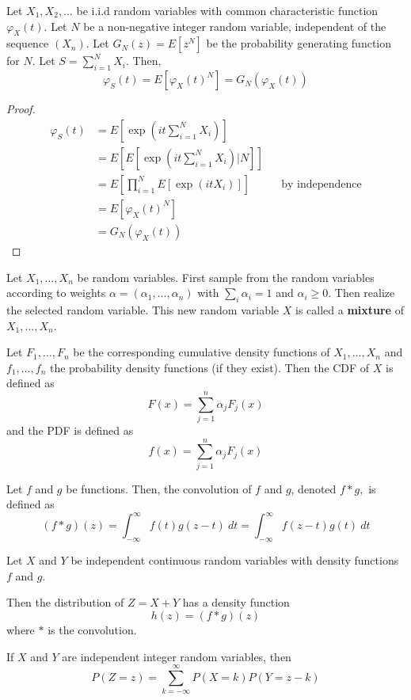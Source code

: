 \begin{theorem}\label{thm:char_func_random_sum}
Let $X_1, X_2, \ldots$ be i.i.d random variables with common characteristic function $\varphi_X(t)$.
Let $N$ be a non-negative integer random variable, independent of the sequence $(X_n)$.
Let $G_N(z) = E[z^N]$ be the probability generating function for $N$.
Let $S = \sum_{i = 1}^N X_i$.
Then,
$$
\varphi_S(t) = E[\varphi_X(t)^N] = G_N(\varphi_X(t))
$$
\end{theorem}

\begin{proof}
\begin{align*}
    \varphi_S(t) &= E[ \exp(it \sum_{i = 1}^N X_i) ]\\
    &= E[ E[ \exp(it \sum_{i = 1}^N X_i) | N ]]\\
    &= E \left[ \prod_{i = 1}^N E[\exp(it X_i)] \right] && \text{by independence}\\
    &= E[\varphi_X(t)^N]\\
    &= G_N(\varphi_X(t))
\end{align*}
\end{proof}

\begin{defn}
Let $X_1,\ldots, X_n$ be random variables.
First sample from the random variables according to weights $\alpha = (\alpha_1, \ldots, \alpha_n)$ with $\sum_i \alpha_i = 1$ and $\alpha_i \geq 0$.
Then realize the selected random variable.
This new random variable $X$ is called a \textbf{mixture} of $X_1,\ldots, X_n$.

Let $F_1, \ldots, F_n$ be the corresponding cumulative density functions of $X_1, \ldots, X_n$ and $f_1, \ldots, f_n$ the probability density functions (if they exist).
Then the CDF of $X$ is defined as
$$
F(x) = \sum_{j = 1}^n \alpha_j F_j(x)
$$
and the PDF is defined as
$$
f(x) = \sum_{j = 1}^n \alpha_j F_j(x)
$$
\end{defn}

\begin{defn}[Convolution]
Let $f$ and $g$ be functions. Then, the convolution of $f$ and $g$, denoted $f * g,$ is defined as
$$
(f * g)(z) = \int_{-\infty}^\infty f(t) g(z - t)~dt =  \int_{-\infty}^\infty f(z - t) g(t)~dt
$$
\end{defn}

\begin{theorem}
Let $X$ and $Y$ be independent continuous random variables with density functions $f$ and $g$.

Then the distribution of $Z = X + Y$ has a density function
$$
h(z) = (f * g)(z)
$$
where $*$ is the convolution.

If $X$ and $Y$ are independent integer random variables, then
$$
P(Z = z) = \sum_{k = -\infty}^\infty P(X = k) P(Y = z - k)
$$
\end{theorem}

